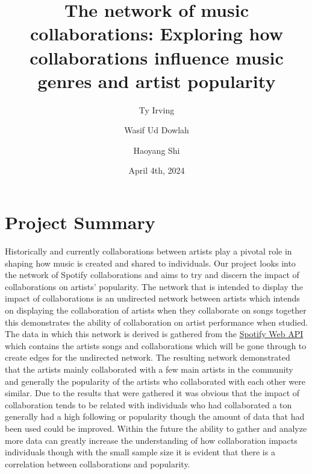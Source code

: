 \documentclass[12pt,a4paper]{article}
\title{The network of music collaborations: Exploring how collaborations influence music genres and artist popularity}
\author[1]{Ty Irving}
\author[2]{Wasif Ud Dowlah}
\author[3]{Haoyang Shi}
\affil[1]{\small CPSC 572, 30105319}
\affil[2]{CPSC 572, 30130706}
\affil[3]{CPSC 572, 30105296}
\date{April 4th, 2024}  %
\begin{document}
\maketitle

\section{Project Summary}
  Historically and currently collaborations between artists play a pivotal role in shaping how music is created and shared to individuals.  Our project looks into the network of Spotify collaborations and aims to try and discern the impact of collaborations on artists' popularity.  The network that is intended to display the impact of collaborations is an undirected network between artists which intends on displaying the collaboration of artists when they collaborate on songs together this demonstrates the ability of collaboration on artist performance when studied.  The data in which this network is derived is gathered from the \href{https://developer.spotify.com/documentation/web-api}{Spotify Web API} which contains the artists songs and collaborations which will be gone through to create edges for the undirected network.  The resulting network demonstrated that the artists mainly collaborated with a few main artists in the community and generally the popularity of the artists who collaborated with each other were similar.  Due to the results that were gathered it was obvious that the impact of collaboration tends to be related with individuals who had collaborated a ton generally had a high following or popularity though the amount of data that had been used could be improved.  Within the future the ability to gather and analyze more data can greatly increase the understanding of how collaboration impacts individuals though with the small sample size it is evident that there is a correlation between collaborations and popularity.


\end{document}
